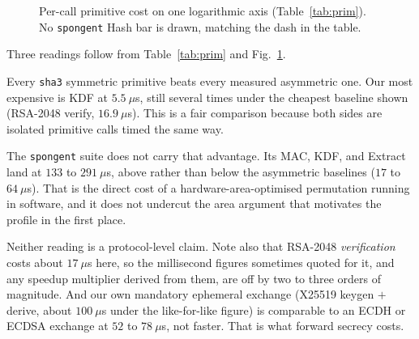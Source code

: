 \documentclass[conference]{IEEEtran}
\begin{document}
\begin{figure}[H]
\centering
{}
\caption{Per-call primitive cost on one logarithmic axis (Table~\ref{tab:prim}).
No \texttt{spongent} Hash bar is drawn, matching the dash in the table.}
\label{fig:prim}
\end{figure}

Three readings follow from Table~\ref{tab:prim} and Fig.~\ref{fig:prim}.

Every \texttt{sha3} symmetric primitive beats every measured asymmetric one.
Our most expensive is KDF at $5.5~\mu$s, still several times under the cheapest
baseline shown (RSA-2048 verify, $16.9~\mu$s). This is a fair comparison
because both sides are isolated primitive calls timed the same way.

The \texttt{spongent} suite does not carry that advantage. Its MAC, KDF, and
Extract land at $133$ to $291~\mu$s, above rather than below the asymmetric
baselines ($17$ to $64~\mu$s). That is the direct cost of a
hardware-area-optimised permutation running in software, and it does not
undercut the area argument that motivates the profile in the first place.

Neither reading is a protocol-level claim. Note also that RSA-2048
\emph{verification} costs about $17~\mu$s here, so the millisecond figures
sometimes quoted for it, and any speedup multiplier derived from them, are off
by two to three orders of magnitude. And our own mandatory ephemeral exchange
(X25519 keygen $+$ derive, about $100~\mu$s under the like-for-like figure) is
comparable to an ECDH or ECDSA exchange at $52$ to $78~\mu$s, not faster. That
is what forward secrecy costs.
\end{document}
